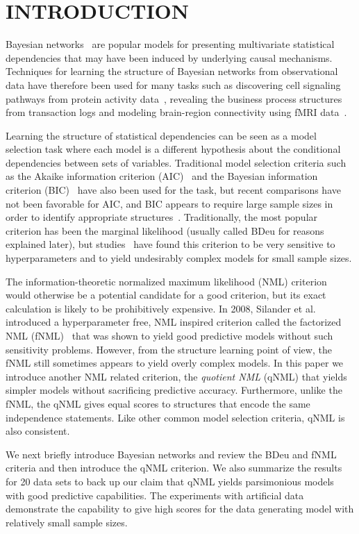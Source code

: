 \section{INTRODUCTION}
\label{sec:intro}
Bayesian networks~\cite{Pear88} are popular models for presenting
multivariate statistical dependencies that may have been induced by
underlying causal mechanisms.  Techniques for learning the structure
of Bayesian networks from observational data have therefore been used
for many tasks such as discovering cell signaling pathways from
protein activity data~\cite{bn4sigpath02}, revealing the business
process structures~\cite{bn4bpmining} from transaction logs and
modeling brain-region connectivity using fMRI
data~\cite{bn4brainconnect}.

Learning the structure of statistical dependencies can be seen as a
model selection task where each model is a different hypothesis about
the conditional dependencies between sets of variables. Traditional
model selection criteria such as the Akaike information
criterion (AIC)~\cite{Akai73} and the Bayesian information
criterion (BIC)~\cite{Schw78} have also been used for the task, but recent
comparisons have not been favorable for AIC, and BIC appears to
require large sample sizes in order to identify appropriate
structures~\cite{cosco.pgm08a,Liu2012}. Traditionally, the most popular
criterion has been the marginal likelihood (usually called BDeu for
reasons explained later), but studies~\cite{cosco.uai07,Steck08} have
found this criterion to be very sensitive to hyperparameters and to
yield undesirably complex models for small sample sizes.

The information-theoretic normalized maximum likelihood (NML)
criterion~\cite{Shta87,Riss96a} would otherwise be a potential candidate
for a good criterion, but its exact calculation is likely to be
prohibitively expensive. In 2008, Silander et al. introduced a
hyperparameter free, NML inspired criterion called the factorized NML
(fNML)~\cite{cosco.pgm08a} that was shown to yield good predictive
models without such sensitivity problems. However, from the structure
learning point of view, the fNML still sometimes appears to yield
overly complex models. In this paper we introduce another NML related
criterion, the \textit{quotient NML} (qNML) that yields simpler models
without sacrificing predictive accuracy. Furthermore, unlike the fNML,
the qNML gives equal scores to structures that encode the same
independence statements. Like other common model selection criteria,
qNML is also consistent.

We next briefly introduce Bayesian networks and review the BDeu and
fNML criteria and then introduce the qNML criterion.  We also
summarize the results for 20 data sets to back up our claim that qNML
yields parsimonious models with good predictive capabilities. The
experiments with artificial data demonstrate the capability to give
high scores for the data generating model with relatively small sample
sizes.

